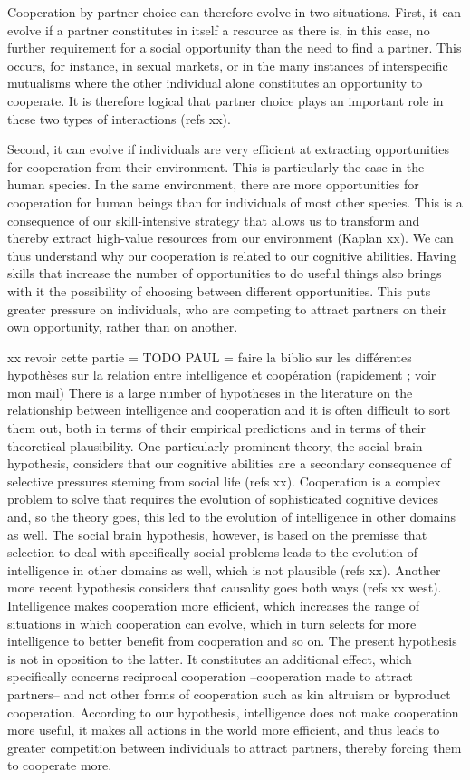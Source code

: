 \documentclass[twocolumn]{article}
\begin{document}
Cooperation by partner choice can therefore evolve in two situations. First, it can evolve if a partner constitutes in itself a resource as there is, in this case,  no further requirement for a social opportunity than the need to find a partner. This occurs, for instance, in sexual markets, or in the many instances of interspecific mutualisms where the other individual alone constitutes an opportunity to cooperate. It is therefore logical that partner choice plays an important role in these two types of interactions (refs xx).

Second, it can evolve if individuals are very efficient at extracting opportunities for cooperation from their environment. This is particularly the case in the human species. In the same environment, there are more opportunities for cooperation for human beings than for individuals of most other species. This is a consequence of our skill-intensive strategy that allows us to transform and thereby extract high-value resources from our environment (Kaplan xx). We can thus understand why our cooperation is  related to our cognitive abilities. Having skills that increase the number of opportunities to do useful things also brings with it the possibility of choosing between different opportunities. This puts greater pressure on individuals, who are competing to attract partners on their own opportunity, rather than on another. 

xx revoir cette partie = TODO PAUL = faire la biblio sur les différentes hypothèses sur la relation entre intelligence et coopération (rapidement ; voir mon mail)
There is a large number of hypotheses in the literature on the relationship between intelligence and cooperation and it is often difficult to  sort them out, both in terms of their empirical predictions and in terms of their theoretical plausibility. One particularly prominent theory, the social brain hypothesis, considers that our cognitive abilities are a secondary consequence of selective pressures steming from social life (refs xx). Cooperation is a complex problem to solve that requires the evolution of sophisticated cognitive devices and, so the theory goes, this led to the evolution of intelligence in other domains as well. The social brain hypothesis, however, is based on the premisse that selection to deal with specifically social problems leads to the evolution of intelligence in other domains as well, which is not plausible (refs xx). Another more recent hypothesis considers that causality goes both ways (refs xx west). Intelligence makes cooperation more efficient, which increases the range of situations in which cooperation can evolve, which in turn selects for more intelligence to better benefit from cooperation and so on. The present hypothesis is not in oposition to the latter. It constitutes an additional effect, which specifically concerns reciprocal cooperation --cooperation made to attract partners-- and not other forms of cooperation such as kin altruism or byproduct cooperation. According to our hypothesis, intelligence does not make cooperation more useful, it makes all actions in the world more efficient, and thus leads to greater competition between individuals to attract partners, thereby forcing them to cooperate more.
\end{document}
